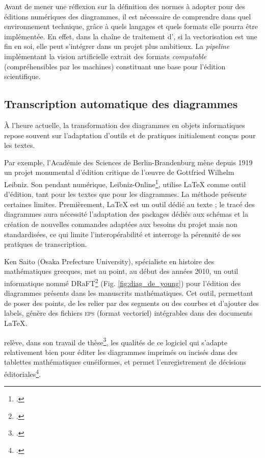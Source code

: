 Avant de mener une réflexion sur la définition des normes à adopter pour
des éditions numériques des diagrammes, il est nécessaire de comprendre
dans quel environnement technique, grâce à quels langages et quels
formats elle pourra être implémentée. En effet, dans la chaîne de
traitement d'\eida, si la vectorisation est une fin en soi, elle peut
s'intégrer dans un projet plus ambitieux. La \textit{pipeline} implémentant la
vision artificielle extrait des formats \emph{computable}
(compréhensibles par les machines) constituant une base pour l'édition
scientifique.

\hypertarget{transcription-automatique-des-diagrammes}{%
\subsection{Transcription automatique des
diagrammes}\label{transcription-automatique-des-diagrammes}}

À l'heure actuelle, la transformation des diagrammes en objets
informatiques repose souvent sur l'adaptation d'outils et de pratiques
initialement conçus pour les textes.

Par exemple, l'Académie des Sciences de Berlin-Brandenburg mène depuis
1919 un projet monumental d'édition critique de l'œuvre de Gottfried
Wilhelm Leibniz. Son pendant numérique, Leibniz-Online\footcite{noauthor_leibniz_nodate}, utilise
\LaTeX\xspace comme outil d'édition, tant pour les textes que pour les
diagrammes. La méthode présente certaines limites. Premièrement, \LaTeX\xspace
est un outil dédié au texte ; le tracé des diagrammes aura nécessité
l'adaptation des packages dédiés aux schémas et la création de
nouvelles commandes adaptées aux besoins du projet mais non
standardisées, ce qui limite l'interopérabilité et interroge la
pérennité de ses pratiques de transcription.

Ken Saito (Osaka Prefecture University), spécialiste en histoire des
mathématiques grecques, met au point, au début des années 2010, un outil
informatique nommé DRaFT\footcite{noauthor_draft_nodate} (Fig. \ref{fig:diag_de_young}) pour l'édition des diagrammes présents dans les
manuscrits mathématiques. Cet outil, permettant de poser des points, de
les relier par des segments ou des courbes et d'ajouter des labels,
génère des fichiers \textsc{eps} (format vectoriel) intégrables dans des
documents \LaTeX\xspace.

\citeauthor{reynaud_diagrammes_2017} relève, dans son travail de thèse\footcite[p.292]{reynaud_diagrammes_2017}, les qualités de ce logiciel qui s’adapte relativement bien pour éditer les diagrammes imprimés ou incisés dans des tablettes mathématiques cunéiformes, et permet l'enregistrement de décisions éditoriales\footcite[``Pour chacune des lignes
ainsi définies, il est ensuite possible de choisir selon son statut (présente sur le diagramme,
reconstituée, bordure du document, etc) un style différent (plein, tirets, pointillés, etc).''][p.292]{reynaud_diagrammes_2017}.


